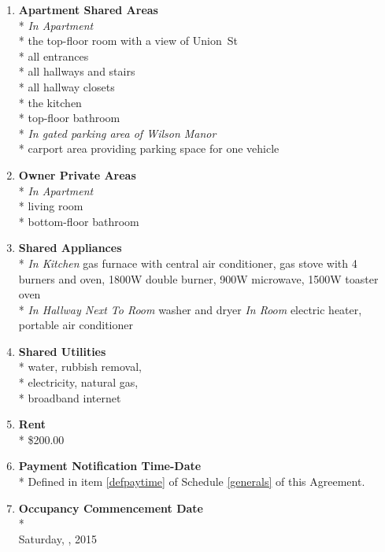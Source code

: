 \documentclass[12pt,letterpaper]{article}
\newcommand{\datefillin}{\hspace{0.2cm}\makebox[3cm]{\hrulefill}}
\newcommand{\condo}{Wilson Manor}
\newcommand{\apt}{Apartment}
\newcommand{\room}{Room}
\newcommand{\shared}{Apartment Shared Areas}
\newcommand{\livingroom}{Owner Private Areas}
\newcommand{\appliances}{Shared Appliances}
\newcommand{\utilities}{Shared Utilities}
\newcommand{\firstday}{Occupancy Commencement Date}
\newcommand{\paymenttime}{Payment Notification Time-Date}
\begin{document}
\begin{multicols}{2}
\begin{enumerate}
			\item \textbf{\shared{}}\\* \label{shared}
				\textit{In \apt{}}\\*
				the top-floor room with a view of Union~St\\*
				all entrances\\*
				all hallways and stairs\\*
				all hallway closets\\*
				the kitchen\\*
				top-floor bathroom\\*
				\textit{In gated parking area of \condo{}}\\*
				carport area providing parking space for one vehicle
				
			\item \textbf{\livingroom{}}\\* \label{livingroom}
				\textit{In \apt{}}\\*
				living room\\*
				bottom-floor bathroom
				
			\item \textbf{\appliances}\\* \label{appliances}
				\textit{In Kitchen} gas furnace with central air conditioner, 
				gas stove with 4 burners and oven, 
				1800W double burner,
				900W microwave,
				1500W toaster oven\\*
				\textit{In Hallway Next To \room{}} washer and dryer
				\textit{In \room{}} electric heater,
				portable air conditioner
				
			\item \textbf{\utilities{}}\\* \label{utilities}
				water,
				rubbish removal,\\*
				electricity,
				natural gas,\\*
				broadband internet

			\item \textbf{Rent}\\* \label{rent}
				\$200.00

			\item \textbf{\paymenttime{}}\\* \label{paymenttime}
				Defined in item \ref{defpaytime} of Schedule \ref{generals} of this Agreement.

			\item \textbf{\firstday{}} \label{firstday} \\* \\
				Saturday, \datefillin, 2015


\end{enumerate}
\end{multicols}
\end{document}
